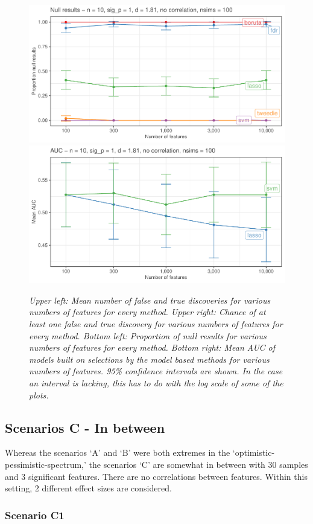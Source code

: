 \documentclass[
]{article}
\begin{document}
\begin{figure}

{\centering \includegraphics[width=0.49\linewidth]{main_files/figure-latex/B2-1} \includegraphics[width=0.49\linewidth]{main_files/figure-latex/B2-2} 

}

\caption{\textit{Upper left: Mean number of false and true discoveries for various numbers of features for every method. Upper right: Chance of at least one false and true discovery for various numbers of features for every method. Bottom left: Proportion of null results for various numbers of features for every method. Bottom right: Mean AUC of models built on selections by the model based methods for various numbers of features. 95\% confidence intervals are shown. In the case an interval is lacking, this has to do with the log scale of some of the plots.}}\label{fig:B2}
\end{figure}

\hypertarget{scenarios-c---in-between}{%
\subsection{Scenarios C - In between}\label{scenarios-c---in-between}}

Whereas the scenarios `A' and `B' were both extremes in the `optimistic-pessimistic-spectrum,' the scenarios `C' are somewhat in between with 30 samples and 3 significant features. There are no correlations between features. Within this setting, 2 different effect sizes are considered.

\hypertarget{scenario-c1}{%
\subsubsection{Scenario C1}\label{scenario-c1}}
\end{document}
